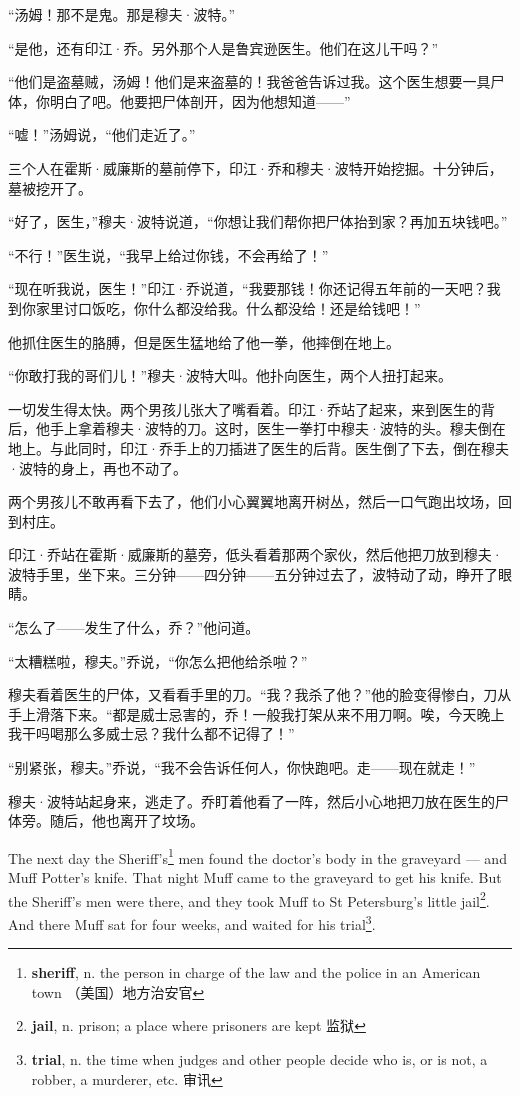\documentclass[fontset=ubuntu, zihao=5]{ctexart}
\begin{document}
\begin{paracol}{2}
“汤姆！那不是鬼。那是穆夫·波特。”

“是他，还有印江·乔。另外那个人是鲁宾逊医生。他们在这儿干吗？”

“他们是盗墓贼，汤姆！他们是来盗墓的！我爸爸告诉过我。这个医生想要一具尸体，你明白了吧。他要把尸体剖开，因为他想知道——”

“嘘！”汤姆说，“他们走近了。”

三个人在霍斯·威廉斯的墓前停下，印江·乔和穆夫·波特开始挖掘。十分钟后，墓被挖开了。

“好了，医生，”穆夫·波特说道，“你想让我们帮你把尸体抬到家？再加五块钱吧。”

“不行！”医生说，“我早上给过你钱，不会再给了！”

“现在听我说，医生！”印江·乔说道，“我要那钱！你还记得五年前的一天吧？我到你家里讨口饭吃，你什么都没给我。什么都没给！还是给钱吧！”

他抓住医生的胳膊，但是医生猛地给了他一拳，他摔倒在地上。

“你敢打我的哥们儿！”穆夫·波特大叫。他扑向医生，两个人扭打起来。

一切发生得太快。两个男孩儿张大了嘴看着。印江·乔站了起来，来到医生的背后，他手上拿着穆夫·波特的刀。这时，医生一拳打中穆夫·波特的头。穆夫倒在地上。与此同时，印江·乔手上的刀插进了医生的后背。医生倒了下去，倒在穆夫·波特的身上，再也不动了。

两个男孩儿不敢再看下去了，他们小心翼翼地离开树丛，然后一口气跑出坟场，回到村庄。

印江·乔站在霍斯·威廉斯的墓旁，低头看着那两个家伙，然后他把刀放到穆夫·波特手里，坐下来。三分钟——四分钟——五分钟过去了，波特动了动，睁开了眼睛。

“怎么了——发生了什么，乔？”他问道。

“太糟糕啦，穆夫。”乔说，“你怎么把他给杀啦？”

穆夫看着医生的尸体，又看看手里的刀。“我？我杀了他？”他的脸变得惨白，刀从手上滑落下来。“都是威士忌害的，乔！一般我打架从来不用刀啊。唉，今天晚上我干吗喝那么多威士忌？我什么都不记得了！”

“别紧张，穆夫。”乔说，“我不会告诉任何人，你快跑吧。走——现在就走！”

穆夫·波特站起身来，逃走了。乔盯着他看了一阵，然后小心地把刀放在医生的尸体旁。随后，他也离开了坟场。

\switchcolumn*

\sectionbreak

The next day the Sheriff's\footnote{\textbf{sheriff}, n. the person in
  charge of the law and the police in an American town （美国）地方治安官}
men found the doctor's body in the graveyard — and Muff Potter's knife.
That night Muff came to the graveyard to get his knife. But the Sheriff's
men were there, and they took Muff to St Petersburg's little jail\footnote{\textbf{jail}, n. prison; a place where prisoners are kept 监狱}. And there
Muff sat for four weeks, and waited for his trial\footnote{\textbf{trial}, n. the time when judges and other people decide who is, or is not, a robber, a murderer, etc. 审讯}.


\end{paracol}
\end{document}
